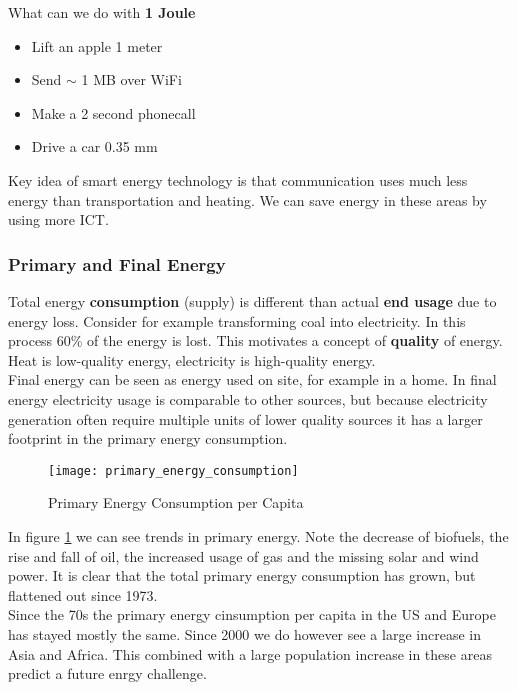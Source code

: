 What can we do with \textbf{1 Joule}
\begin{itemize}
    \item Lift an apple 1 meter
    \item Send $\sim$ 1 MB over WiFi
    \item Make a 2 second phonecall
    \item Drive a car 0.35 mm
\end{itemize}

Key idea of smart energy technology is that communication uses much less energy than transportation and heating.
We can save energy in these areas by using more ICT.

\subsubsection{Primary and Final Energy}
Total energy \textbf{consumption} (supply) is different than actual \textbf{end usage} due to energy loss.
Consider for example transforming coal into electricity.
In this process 60\% of the energy is lost.
This motivates a concept of \textbf{quality} of energy.
Heat is low-quality energy, electricity is high-quality energy.\\

Final energy can be seen as energy used on site, for example in a home.
In final energy electricity usage is comparable to other sources, but because electricity generation often require multiple units of lower quality sources it has a larger footprint in the primary energy consumption.\\

\begin{figure}
    \centering
    \texttt{[image: primary\_energy\_consumption]}
    \caption{Primary Energy Consumption per Capita}
    \label{fig:primary_energy}
\end{figure}

In figure \ref{fig:primary_energy} we can see trends in primary energy.
Note the decrease of biofuels, the rise and fall of oil, the increased usage of gas and the missing solar and wind power. It is clear that the total primary energy consumption has grown, but flattened out since 1973.\\

Since the 70s the primary energy cinsumption per capita in the US and Europe has stayed mostly the same. Since 2000 we do however see a large increase in Asia and Africa. This combined with a large population increase in these areas predict a future enrgy challenge.\\


